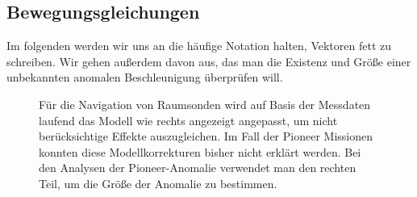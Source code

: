 
\subsection{Bewegungsgleichungen}\label{berechnungen}
Im folgenden werden wir uns an die häufige Notation halten, Vektoren fett zu schreiben. Wir gehen außerdem davon aus, das man die Existenz und Größe einer unbekannten anomalen Beschleunigung überprüfen will.


\begin{figure}[htnb]
\begin{center}
\noindent    
{}
\end{center}
\vskip -10pt
  \caption{Für die Navigation von Raumsonden wird auf Basis der Messdaten laufend das Modell wie rechts angezeigt angepasst, um nicht berücksichtige Effekte auszugleichen. Im Fall der Pioneer Missionen konnten diese Modellkorrekturen bisher nicht erklärt werden. Bei den Analysen der Pioneer-Anomalie verwendet man den rechten Teil, um die Größe der Anomalie zu bestimmen.\cite{Turyshev2010}}\label{fig:nav}
\end{figure} 

